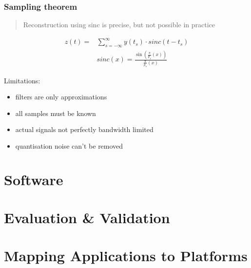 \documentclass{article}
\begin{document}
\subsubsection{Sampling theorem}
\begin{quote}Reconstruction using sinc is precise, but not possible in practice\end{quote}

\begin{align*}
  z(t)    = & \sum_{s=-\infty}^{\infty} y(t_s) \cdot sinc(t-t_s)            \\
            & sinc(x) = \frac{\sin(\frac{\pi}{p_s}(x))}{\frac{\pi}{p_s}(x)}
\end{align*}

Limitations:
\begin{itemize}
  \item filters are only approximations
  \item all samples must be known
  \item actual signals not perfectly bandwidth limited
  \item quantisation noise can't be removed
\end{itemize}


\section{Software}




\section{Evaluation \& Validation}




\section{Mapping Applications to Platforms}
\end{document}
